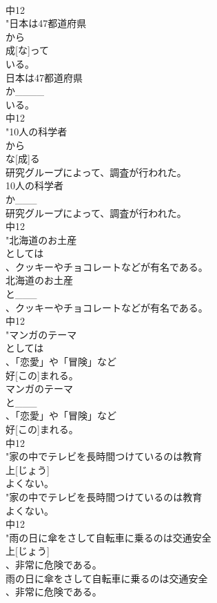 \documentclass[8pt]{extreport}
\begin{document}
\begin{CJK}{UTF8}{min}
\\	中12
\\	"日本は47都道府県
\\	から
\\	成[な]って
\\	いる。
\\	日本は47都道府県
\\	か____
\\	いる。
\\	中12
\\	"10人の科学者
\\	から
\\	な[成]る
\\	研究グループによって、調査が行われた。
\\	10人の科学者
\\	か___
\\	研究グループによって、調査が行われた。
\\	中12
\\	"北海道のお土産
\\	としては
\\	、クッキーやチョコレートなどが有名である。
\\	北海道のお土産
\\	と___
\\	、クッキーやチョコレートなどが有名である。
\\	中12
\\	"マンガのテーマ
\\	としては
\\	、「恋愛」や「冒険」など
\\	好[この]まれる。
\\	マンガのテーマ
\\	と___
\\	、「恋愛」や「冒険」など
\\	好[この]まれる。
\\	中12
\\	"家の中でテレビを長時間つけているのは教育
\\	上[じょう]
\\	よくない。
\\	"家の中でテレビを長時間つけているのは教育
\\	よくない。
\\	中12
\\	"雨の日に傘をさして自転車に乗るのは交通安全
\\	上[じょう]
\\	、非常に危険である。
\\	雨の日に傘をさして自転車に乗るのは交通安全
\\	、非常に危険である。

\end{CJK}
\end{document}
